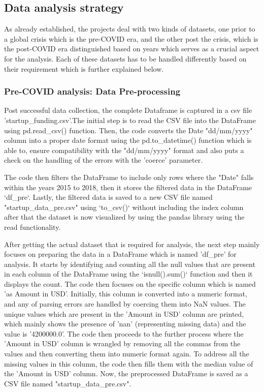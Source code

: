 \documentclass[12pt]{article}
\begin{document}
\subsection{Data analysis strategy}

As already established, the projects deal with two kinds of datasets, one prior to a global crisis which is the pre-COVID era, and the other post the crisis, which is the post-COVID era distinguished based on years which serves as a crucial aspect for the analysis. Each of these datasets has to be handled differently based on their requirement which is further explained below.

\subsubsection{Pre-COVID analysis: Data Pre-processing}

Post successful data collection, the complete Dataframe is captured in a csv file 'startup\_funding.csv'.The initial step is to read the CSV file into the DataFrame using pd.read\_csv() function. Then, the code converts the Date "dd/mm/yyyy" column into a proper date format using the pd.to\_datetime() function which is able to, ensure compatibility with the "dd/mm/yyyy" format and also puts a check on the handling of the errors with the 'coerce' parameter.

The code then filters the DataFrame to include only rows where the "Date" falls within the years 2015 to 2018, then it stores the filtered data in the DataFrame `df\_pre`. Lastly, the filtered data is saved to a new CSV file named "startup\_data\_pre.csv" using `to\_csv()` without including the index column after that the dataset is now visualized by using the pandas library using the read functionality.

After getting the actual dataset that is required for analysis, the next step mainly focuses on preparing the data in a DataFrame which is named 'df\_pre' for analysis. It starts by identifying and counting all the null values that are present in each column of the DataFrame using the `isnull().sum()` function and then it displays the count. The code then focuses on the specific column which is named 'as Amount in USD'. Initially, this column is converted into a numeric format, and any of parsing errors are handled by coercing them into NaN values. The unique values which are present in the 'Amount in USD' column are printed, which mainly shows the presence of 'nan' (representing missing data) and the value is '4200000.0'. The code then proceeds to the further process where the 'Amount in USD' column is wrangled by removing all the commas from the values and then converting them into numeric format again. To address all the missing values in this column, the code then fills them with the median value of the 'Amount in USD' column. Now, the preprocessed DataFrame is saved as a CSV file named "startup\_data\_pre.csv".
\end{document}
